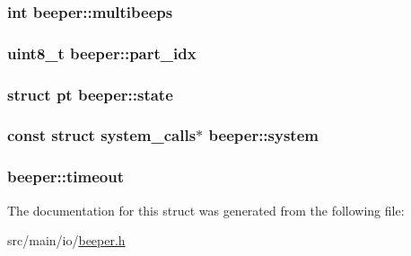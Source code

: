 \hypertarget{structbeeper_aee193ec6a8fa80c1bd048809db61c9a4}{
\subsubsection[{multibeeps}]{\setlength{\rightskip}{0pt plus 5cm}int beeper\+::multibeeps}}\label{structbeeper_aee193ec6a8fa80c1bd048809db61c9a4}
\hypertarget{structbeeper_ad2919512c904f405c7c9f674bb5e5375}{
\subsubsection[{part\+\_\+idx}]{\setlength{\rightskip}{0pt plus 5cm}uint8\+\_\+t beeper\+::part\+\_\+idx}}\label{structbeeper_ad2919512c904f405c7c9f674bb5e5375}
\hypertarget{structbeeper_a5a97f78ac16889d154b5f430d709ecab}{
\subsubsection[{state}]{\setlength{\rightskip}{0pt plus 5cm}struct {\bf pt} beeper\+::state}}\label{structbeeper_a5a97f78ac16889d154b5f430d709ecab}
\hypertarget{structbeeper_aa6ed73a897dd2e40c5a385795e5ff9f6}{
\subsubsection[{system}]{\setlength{\rightskip}{0pt plus 5cm}const struct {\bf system\+\_\+calls}$\ast$ beeper\+::system}}\label{structbeeper_aa6ed73a897dd2e40c5a385795e5ff9f6}
\hypertarget{structbeeper_a28da8e21fa04907edfc4fae193067d54}{
\subsubsection[{timeout}]{ beeper\+::timeout}}\label{structbeeper_a28da8e21fa04907edfc4fae193067d54}


The documentation for this struct was generated from the following file\+:\begin{DoxyCompactItemize}
\item 
src/main/io/\hyperlink{beeper_8h}{beeper.\+h}\end{DoxyCompactItemize}
